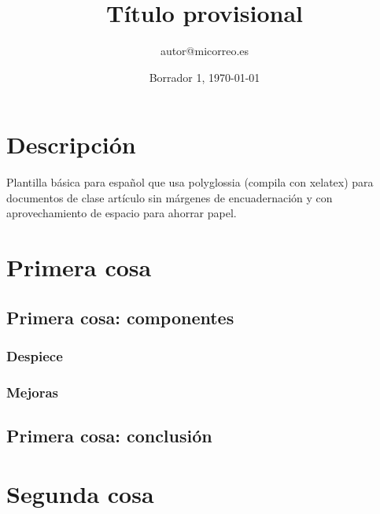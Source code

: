 \documentclass[a4paper,onepage]{article}
\title{Título provisional}
\author{autor@micorreo.es}
\date{Borrador 1, \today}
\begin{document}
\maketitle

\tableofcontents

\newpage

\section{Descripción}

Plantilla básica para español que usa polyglossia (compila con xelatex) para documentos de clase artículo sin márgenes de encuadernación y con aprovechamiento de espacio para ahorrar papel.

\section{Primera cosa}

\lipsum

\subsection{Primera cosa: componentes}

\lipsum

\subsubsection{Despiece}

\lipsum

\subsubsection{Mejoras}

\lipsum

\subsection{Primera cosa: conclusión}

\lipsum

\section{Segunda cosa}

\lipsum
\end{document}
